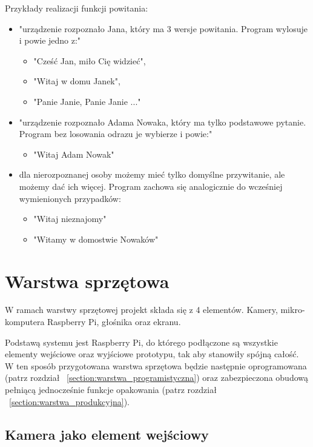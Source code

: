 \documentclass[a4paper,12pt,reqno]{article}
\begin{document}
Przykłady realizacji funkcji powitania:
\begin{itemize}
	\item "urządzenie rozpoznało Jana, który ma 3 wersje powitania. Program wylosuje i powie jedno z:"
	\begin{itemize}
		\item "Cześć Jan, miło Cię widzieć",
		\item "Witaj w domu Janek",
		\item "Panie Janie, Panie Janie ..." %
	\end{itemize}
	\item "urządzenie rozpoznało Adama Nowaka, który ma tylko podstawowe pytanie. Program bez losowania odrazu je wybierze i powie:"
	\begin{itemize}
		\item "Witaj Adam Nowak"
	\end{itemize}
	\item dla nierozpoznanej osoby możemy mieć tylko domyślne przywitanie, ale możemy dać ich więcej. Program zachowa się analogicznie do wcześniej wymienionych przypadków:
	\begin{itemize}
		\item "Witaj nieznajomy"
		\item "Witamy w domostwie Nowaków"
	\end{itemize}
\end{itemize}

\newpage
\section{Warstwa sprzętowa} \label{section:warstwa_sprzetowa}

W ramach warstwy sprzętowej projekt składa się z 4 elementów. Kamery, mikro-komputera Raspberry Pi, głośnika oraz ekranu.

Podstawą systemu jest Raspberry Pi, do którego podłączone są wszystkie elementy wejściowe oraz wyjściowe prototypu, tak aby stanowiły spójną całość. W ten sposób przygotowana warstwa sprzętowa będzie następnie oprogramowana (patrz rozdział ~\ref{section:warstwa_programistyczna}) oraz zabezpieczona obudową pełniącą jednocześnie funkcje opakowania (patrz rozdział ~\ref{section:warstwa_produkcyjna}).

\subsection{Kamera jako element wejściowy}
\end{document}
